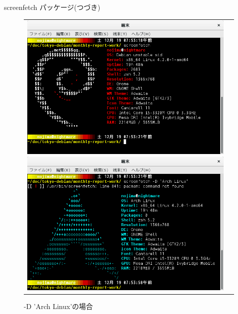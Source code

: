 \begin{frame}{screenfetch パッケージ(つづき)}

\begin{figure}[htbp]
\begin{tabular}{cc}
\begin{minipage}{0.5\hsize}
\includegraphics[width=0.8\hsize]{image201512/debian-screenfetch.png}
\caption{screenfetch起動}
\end{minipage}
\begin{minipage}{0.5\hsize}
\includegraphics[width=0.8\hsize]{image201512/arch-screenfetch.png}
\caption{-D 'Arch Linux'の場合}
\end{minipage}
\end{tabular}
\end{figure}

\end{frame}

